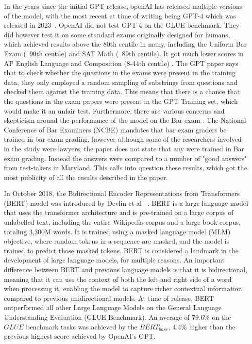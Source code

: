 \documentclass{UoYCSproject}
\begin{document}
    \par

    In the years since the initial GPT release, openAI has released multiple versions of the model, with the most recent at time of writing being GPT-4 which was released in 2023~\cite{openai2024gpt4}.
    OpenAI did not test GPT-4 on the GLUE benchmark.
    They did however test it on some standard exams originally designed for humans, which achieved results above the 80th centile in many, including the Uniform Bar Exam (~90th centile) and SAT Math (~89th centile). It got much lower scores in AP English Language and Composition (8-44th centile)  \cite{openai2024gpt4}.
    The GPT paper says that to check whether the questions in the exams were present in the training data, they only employed a random sampling of substrings from questions and checked them against the training data.
    This means that there is a chance that the questions in the exam papers were present in the GPT Training set, which would make it an unfair test.
    Furthermore, there are various concerns and skepticism around the performance of the model on the Bar exam \cite{Sullivan2024-bk, EvalBarGPT}.
    The National Conference of Bar Examiners (NCBE) mandates that bar exam graders be trained in bar exam grading, however although some of the researchers involved in the study were lawyers, the paper does not state that any were trained in Bar exam grading.
    Instead the answers were compared to a number of "good answers" from test-takers in Maryland.
    This calls into question these results, which got the most publicity of all the results described in the paper. \par

    \par

    In October 2018, the Bidirectional Encoder Representations from Transformers (BERT) model was introduced by Devlin et al~\cite{devlin2019bert} .
    BERT is a large language model that uses the transformer architecture and is pre-trained on a large corpus of unlabelled text, including the entire Wikipedia corpus and a large book corpus, totaling 3,300M words.
    It is trained using a masked language model (MLM) objective, where random tokens in a sequence are masked, and the model is trained to predict those masked tokens.
    BERT is considered a landmark in the development of large language models, for multiple reasons.
    An important difference between BERT and previous language models is that it is bidirectional, meaning that it can
    use the context of both the left and right side of a word when processing it, enabling the model to capture richer contextual information compared to previous unidirectional models.
    At time of release, BERT outperformed all other Large Language Models on the General Language Understanding Evaluation (GLUE Benchmark).
    An average of 79.6\% on the $GLUE$ benchmark tasks was achieved by the $BERT_{base}$, 4.4\% higher than the previous highest score achieved by OpenAI's GPT.
\end{document}
